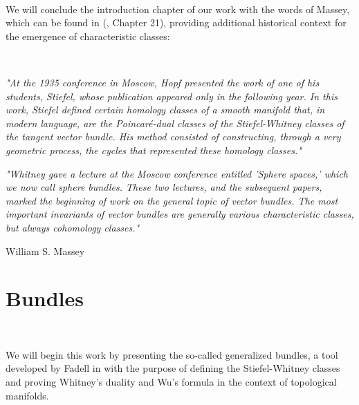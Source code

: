 \documentclass[12pt,oneside]{book}
\begin{document}
    \
    
    We will conclude the introduction chapter of our work with the words of Massey, which can be found 
    in (\cite{james}, Chapter 21), providing additional historical context for the emergence of 
    characteristic classes:

    \

    \begin{center}
        \begin{minipage}{12cm}
            \textit{"At the 1935 conference in Moscow, Hopf presented the work of one of his students, 
            Stiefel, whose publication appeared only in the following year. In this work, Stiefel 
            defined certain homology classes of a smooth manifold that, in modern language, are the 
            Poincaré-dual classes of the Stiefel-Whitney classes of the tangent vector bundle. His 
            method consisted of constructing, through a very geometric process, the cycles that 
            represented these homology classes."}
        \end{minipage}
    \end{center}

    \vspace{0.5cm}

    \begin{center}
        \begin{minipage}{12cm}
            \textit{"Whitney gave a lecture at the Moscow conference entitled 'Sphere spaces,' which we 
            now call sphere bundles. These two lectures, and the subsequent papers, marked the beginning 
            of work on the general topic of vector bundles. The most important invariants of vector 
            bundles are generally various characteristic classes, but always cohomology classes."}
            \begin{flushright}
                William S. Massey
            \end{flushright}
        \end{minipage}
    \end{center}

    

    \chapter{Bundles}\label{cap_fib}
    \thispagestyle{empty}

    \

    We will begin this work by presenting the so-called generalized bundles, a 
    tool developed by Fadell in \cite{fadell_1} with the purpose of defining the Stiefel-Whitney 
    classes and proving Whitney's duality and Wu's 
    formula in the context of topological manifolds.
\end{document}
